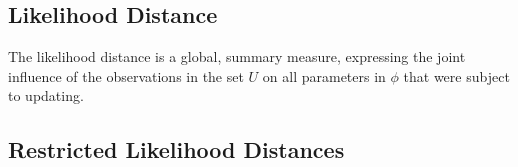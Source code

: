 \documentclass[Main.tex]{subfiles}
\begin{document}
\subsection{Likelihood Distance}

The  likelihood distance is a global, summary measure, expressing the joint influence of the observations in the set $U$ on all parameters in $\phi$  that were subject to updating.


\newpage
\subsection{Restricted Likelihood Distances}

\end{document}
